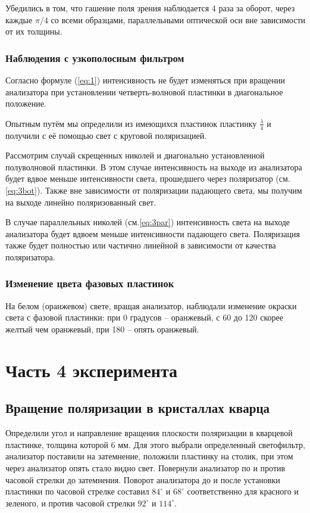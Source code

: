 Убедились в том, что гашение поля зрения наблюдается 4 раза за оборот, через каждые $\pi/4$ со всеми образцами, параллельными оптической оси вне зависимости от их толщины.



\subsubsection{Наблюдения с узкополосным фильтром}
Согласно формуле (\ref{eq:1}) интенсивность не будет изменяться при вращении анализатора при установлении четверть-волновой пластинки в диагональное положение. 

Опытным путём мы определили из имеющихся пластинок пластинку $\frac{\lambda}{4}$ и получили с её помощью свет с круговой поляризацией.

Рассмотрим случай скрещенных николей и диагонально установленной полуволновой пластинки. В этом случае интенсивность на выходе из анализатора будет вдвое меньше интенсивности света, прошедшего через поляризатор (см.\ref{eq:3bot}). Также вне зависимости от поляризации падающего света, мы получим на выходе линейно поляризованный свет.

В случае параллельных николей (см.\ref{eq:3par}) интенсивность света на выходе анализатора будет вдвоем меньше интенсивности падающего света. Поляризация также будет полностью или частично линейной в зависимости от качества поляризатора. 

\subsubsection{Изменение цвета фазовых пластинок}

На белом (оранжевом) свете, вращая анализатор, наблюдали изменение окраски света с  фазовой пластинки: при 0 градусов -- оранжевый, с 60 до 120 скорее желтый чем оранжевый, при 180 -- опять оранжевый.

\section{Часть 4 эксперимента}
\subsection{Вращение поляризации в кристаллах кварца}
Определили угол и направление вращения плоскости поляризации в кварцевой пластинке, толщина которой 6 мм. Для этого выбрали определенный светофильтр, анализатор поставили на затемнение, положили пластинку на столик, при этом через анализатор опять стало видно свет. Повернули анализатор по и против часовой стрелки до затемнения. 
Поворот анализатора до и после установки пластинки  по часовой стрелке составил $84^{\circ}$ и $68^{\circ}$ соответственно для красного и зеленого, и против часовой стрелки $92^{\circ}$ и  $114^{\circ}$. 

